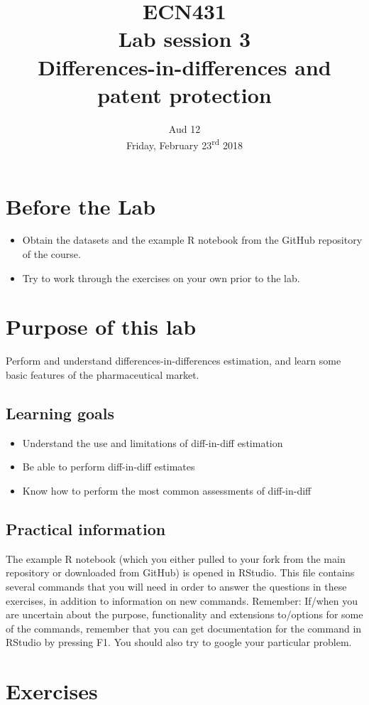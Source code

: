 \documentclass[12pt,a4paper]{article}
\title{ECN431\\Lab session 3 \\ Differences-in-differences and patent protection}
\date{Aud 12 \\ Friday, February 23\textsuperscript{rd} 2018}
\begin{document}
\maketitle

\section*{Before the Lab}
\begin{itemize}
\item Obtain the datasets and the example R notebook from the GitHub repository of the course.
\item Try to work through the exercises on your own prior to the lab.
\end{itemize}

\section*{Purpose of this lab}
Perform and understand differences-in-differences estimation, and learn some basic features of the pharmaceutical market.

\subsection*{Learning goals}
\begin{itemize}
\item	Understand the use and limitations of diff-in-diff estimation
\item	Be able to perform diff-in-diff estimates
\item	Know how to perform the most common assessments of diff-in-diff
\end{itemize}


\subsection*{Practical information}
The example R notebook (which you either pulled to your fork from the main repository or downloaded from GitHub) is opened in RStudio. This file contains several commands that you will need in order to answer the questions in these exercises, in addition to information on new commands. Remember: If/when you are uncertain about the purpose, functionality and extensions to/options for some of the commands, remember that you can get documentation for the command in RStudio by pressing F1. You should also try to google your particular problem.


\section*{Exercises}
\end{document}
